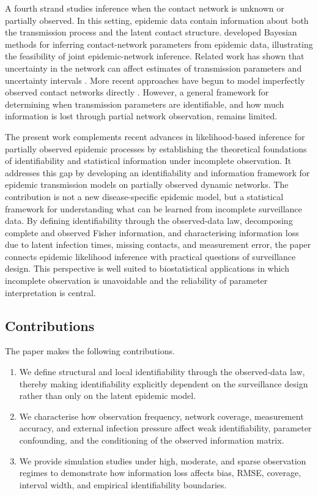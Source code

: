 \documentclass[10pt]{article}
\begin{document}
A fourth strand studies inference when the contact network is unknown or partially observed. In this setting, epidemic data contain information about both the transmission process and the latent contact structure. \citet{groendyke2011bayesian} developed Bayesian methods for inferring contact-network parameters from epidemic data, illustrating the feasibility of joint epidemic-network inference. Related work has shown that uncertainty in the network can affect estimates of transmission parameters and uncertainty intervals \citep{bu2022likelihood, reeves2024model, bu2025stochastic, morsomme2025exact}. More recent approaches have begun to model imperfectly observed contact networks directly \citep{danon2011networks, heesterbeek2015modeling, almutiry2021contact}. However, a general framework for determining when transmission parameters are identifiable, and how much information is lost through partial network observation, remains limited.

The present work complements recent advances in likelihood-based inference for partially observed epidemic processes \citep{asaduzzaman2026complete} by establishing the theoretical foundations of identifiability and statistical information under incomplete observation. It addresses this gap by developing an identifiability and information framework for epidemic transmission models on partially observed dynamic networks. The contribution is not a new disease-specific epidemic model, but a statistical framework for understanding what can be learned from incomplete surveillance data. By defining identifiability through the observed-data law, decomposing complete and observed Fisher information, and characterising information loss due to latent infection times, missing contacts, and measurement error, the paper connects epidemic likelihood inference with practical questions of surveillance design. This perspective is well suited to biostatistical applications in which incomplete observation is unavoidable and the reliability of parameter interpretation is central.

\subsection{Contributions}
The paper makes the following contributions.
\begin{enumerate}
\item We define structural and local identifiability through the observed-data law, thereby making identifiability explicitly dependent on the surveillance design rather than only on the latent epidemic model.
\item We characterise how observation frequency, network coverage, measurement accuracy, and external infection pressure affect weak identifiability, parameter confounding, and the conditioning of the observed information matrix.
\item We provide simulation studies under high, moderate, and sparse observation regimes to demonstrate how information loss affects bias, RMSE, coverage, interval width, and empirical identifiability boundaries.
\end{enumerate}
\end{document}
